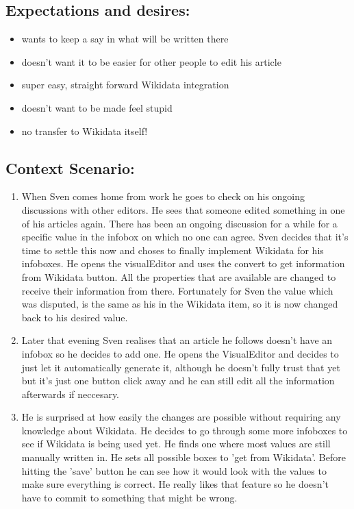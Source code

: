 \documentclass{article}
\begin{document}
\subsection{Expectations and desires:}
\begin{itemize}
\item wants to keep a say in what will be written there
\item doesn't want it to be easier for other people to edit his article
\item super easy, straight forward Wikidata integration
\item doesn't want to be made feel stupid
\item no transfer to Wikidata itself!
\end{itemize}

\subsection{Context Scenario:}
\begin{enumerate}
\item When Sven comes home from work he goes to check on his ongoing discussions with other editors. He sees that someone edited something in one of his articles again. There has been an ongoing discussion for a while for a specific value in the infobox on which no one can agree. Sven decides that it's time to settle this now and choses to finally implement Wikidata for his infoboxes. He opens the visualEditor and uses the convert to get information from Wikidata button. All the properties that are available are changed to receive their information from there. Fortunately for Sven the value which was disputed, is the same as his in the Wikidata item, so it is now changed back to his desired value.  
\item Later that evening Sven realises that an article he follows doesn't have an infobox so he decides to add one. He opens the VisualEditor and decides to just let it automatically generate it, although he doesn't fully trust that yet but it's just one button click away and he can still edit all the information afterwards if neccesary. 
\item He is surprised at how easily the changes are possible without requiring any knowledge about Wikidata. He decides to go through some more infoboxes to see if Wikidata is being used yet. He finds one where most values are still manually written in. He sets all possible boxes to 'get from Wikidata'. Before hitting the 'save' button he can see how it would look with the values to make sure everything is correct. He really likes that feature so he doesn't have to commit to something that might be wrong. 
\end{enumerate}
\end{document}
